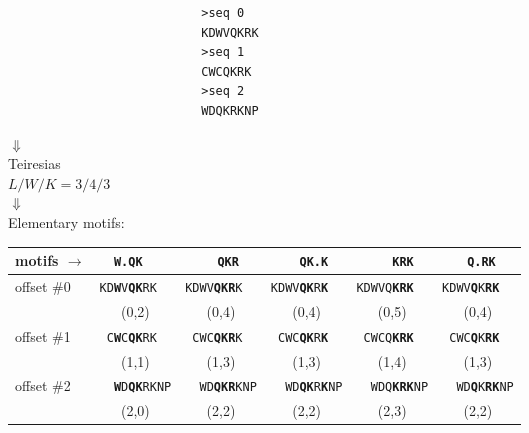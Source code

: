            \begin{figure}[ptb]
            \centering
\begin{verbatim}
                           >seq 0
                           KDWVQKRK
                           >seq 1
                           CWCQKRK
                           >seq 2
                           WDQKRKNP
\end{verbatim}

            $\Downarrow$\\
    Teiresias\\
    $L/W/K = 3/4/3$ \\
            $\Downarrow$\\

            Elementary motifs: \\

            \begin{tabular}{lccccc} \hline\hline
            motifs $\rightarrow$ & \texttt{W.QK~~} & \texttt{~~QKR}& \texttt{~~QK.K}& \texttt{~~~KRK}&
            \texttt{~Q.RK}\\ \hline
            \multirow{2}{*}{offset \#0} &
            \texttt{KD\textbf{W}V\textbf{QK}RK~~} &
            \texttt{KDWV\textbf{QKR}K~~} &
            \texttt{KDWV\textbf{QK}R\textbf{K}~~} &
            \texttt{KDWVQ\textbf{KRK}~~} &
            \texttt{KDWV\textbf{Q}K\textbf{RK}~~} \\
            & (0,2)
            & (0,4)
            & (0,4)
            & (0,5)
            & (0,4)\\ \hline
            \multirow{2}{*}{offset \#1} &
            \texttt{~C\textbf{W}C\textbf{QK}RK~~} &
            \texttt{~CWC\textbf{QKR}K~~} &
            \texttt{~CWC\textbf{QK}R\textbf{K}~~} &
            \texttt{~CWCQ\textbf{KRK}~~} &
            \texttt{~CWC\textbf{Q}K\textbf{RK}~~} \\
            & (1,1)
            & (1,3)
            & (1,3)
            & (1,4)
            & (1,3) \\ \hline
            \multirow{2}{*}{offset \#2} &
            \texttt{~~\textbf{W}D\textbf{QK}RKNP} &
            \texttt{~~WD\textbf{QKR}KNP} &
            \texttt{~~WD\textbf{QK}R\textbf{K}NP} &
            \texttt{~~WDQ\textbf{KRK}NP} &
            \texttt{~~WD\textbf{Q}K\textbf{RK}NP} \\
            & (2,0)
            & (2,2)
            & (2,2)
            & (2,3)
            & (2,2) \\ \hline\hline
            \end{tabular}

\end{figure}
